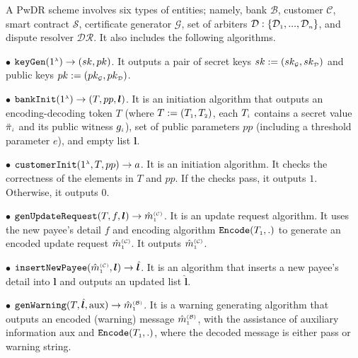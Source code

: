 \begin{definition}\label{def-a::sytax} A PwDR  scheme  involves six   types of entities; namely,  bank $\mathcal{B}$, customer $\mathcal{C}$,  smart contract $\mathcal{S}$,  certificate generator $\mathcal{G}$,   set of arbiters $\mathcal{D}:\{\mathcal{D}_{\scriptscriptstyle 1},..., \mathcal{D}_{\scriptscriptstyle n}\}$, and  dispute resolver $\mathcal{DR}$. It also includes the following    algorithms.  

%


\item [$\bullet$]  $\mathtt{keyGen}(1^{\scriptscriptstyle \lambda})\rightarrow (sk,pk)$. It  outputs a pair of secret keys $sk:=(sk_{\scriptscriptstyle\mathcal {G}},sk_{\scriptscriptstyle\mathcal {D}})$ and public keys $pk:=(pk_{\scriptscriptstyle\mathcal {G}},pk_{\scriptscriptstyle\mathcal {D}})$. 
%
\item[$\bullet$] $\mathtt{bankInit}(1^{\scriptscriptstyle \lambda})\rightarrow (T, pp, \bm{l})$. It is an  initiation algorithm that outputs an encoding-decoding token $T$ (where  $T:=(T_{\scriptscriptstyle 1},T_{\scriptscriptstyle 2})$,  each $T_{\scriptscriptstyle i}$  contains  a secret value $\ddot\pi_{\scriptscriptstyle i}$ and its  public witness $g_{\scriptscriptstyle i}$),  set of  public parameters  $pp$  (including a threshold parameter $e$),  and    empty list $\bm{l}$.
%
\item[$\bullet$] $\mathtt{customerInit} (1^{\scriptscriptstyle \lambda}, T, pp)\rightarrow a$. It is an   initiation algorithm. It checks the correctness of the elements in $T$ and $pp$. If the checks pass, it outputs $1$. Otherwise, it outputs $0$. 
%
\item [$\bullet$] $\mathtt{genUpdateRequest}(T, f, {\bm l})\rightarrow \hat m^{\scriptscriptstyle\mathcal{(C)}}_{\scriptscriptstyle 1}$.  It is an update request  algorithm. It uses the new payee's detail $f$ and encoding algorithm $\mathtt{Encode}(T_{\scriptscriptstyle 1},.)$ to generate an encoded update request $\hat  m^{\scriptscriptstyle\mathcal{(C)}}_{\scriptscriptstyle 1}$.  It outputs  $\hat  m^{\scriptscriptstyle\mathcal{(C)}}_{\scriptscriptstyle 1}$.
%
\item [$\bullet$] $\mathtt{insertNewPayee}(\hat{m}^{\scriptscriptstyle\mathcal{(C)}}_{\scriptscriptstyle 1}, {\bm l})\rightarrow  \hat{\bm l}$. It is  an algorithm that inserts a new payee's detail into ${\bm l}$ and outputs an updated list $\hat{\bm l}$.
%
\item  [$\bullet$] $\mathtt{genWarning}(T, \hat{\bm l}, \text{aux})\rightarrow \hat m^{\scriptscriptstyle\mathcal{(B)}}_{\scriptscriptstyle1}$. It is a warning generating algorithm that outputs an encoded (warning) message $\hat m^{\scriptscriptstyle\mathcal{(B)}}_{\scriptscriptstyle1}$, with the assistance of auxiliary information $\text{aux}$ and $\mathtt{Encode}(T_{\scriptscriptstyle 1},.)$, where the decoded message is either pass or warning string. 

\end{definition}
